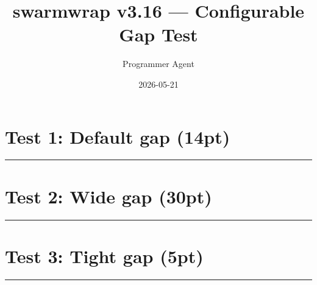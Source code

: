 \documentclass[a4paper,11pt]{article}
\title{swarmwrap v3.16 — Configurable Gap Test}
\author{Programmer Agent}
\date{2026-05-21}
\begin{document}
\maketitle

\section*{Test 1: Default gap (14pt)}

\begin{swarmwrap}%
  \begin{minipage}[t]{3cm}
    \centering
    \rule{\linewidth}{2cm}
  \end{minipage}%
\end{swarmwrap}%
\swarmwrapnext
\lipsum[1]

\newpage
\section*{Test 2: Wide gap (30pt)}

\swarmwrapgap{30pt}

\begin{swarmwrap}%
  \begin{minipage}[t]{3cm}
    \centering
    \rule{\linewidth}{2cm}
  \end{minipage}%
\end{swarmwrap}%
\swarmwrapnext
\lipsum[1]

\newpage
\section*{Test 3: Tight gap (5pt)}

\swarmwrapgap{5pt}

\begin{swarmwrap}%
  \begin{minipage}[t]{3cm}
    \centering
    \rule{\linewidth}{2cm}
  \end{minipage}%
\end{swarmwrap}%
\swarmwrapnext
\lipsum[1]
\end{document}
